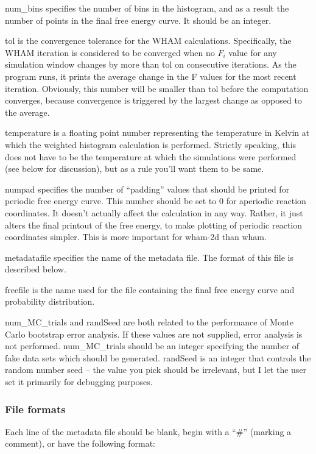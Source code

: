 \documentclass[12pt]{article}
\begin{document}
num\_bins specifies the number of bins in the histogram, and as a result the
number of points in the final free energy curve.  It should be an integer.

tol is the convergence tolerance for the WHAM calculations.  Specifically,
the WHAM iteration is considered to be converged when no $F_i$ value for any
simulation window changes by more than tol on consecutive iterations.  As
the program runs, it prints the average change in the F values for the most
recent iteration.  Obviously, this number will be smaller than tol
before the computation converges, because convergence is triggered by the
largest change as opposed to the average.

temperature is a floating point number representing the temperature in Kelvin at
which the weighted histogram calculation is performed.  Strictly speaking, this
does not have to be the temperature at which the simulations were performed (see
below for discussion), but as a rule you'll want them to be same.

numpad specifies the number of ``padding'' values that should be printed for
periodic free energy curve.  This number should be set to 0 for aperiodic
reaction coordinates.  It doesn't actually affect the calculation in any way.
Rather, it just alters the final printout of the free energy, to make plotting
of periodic reaction coordinates simpler.  This is more important for wham-2d
than wham.

metadatafile specifies the name of the metadata file.  The format of this
file is described below.

freefile is the name used for the file containing the final free energy curve
and probability distribution.

num\_MC\_trials and randSeed are both related to the performance of Monte
Carlo bootstrap error analysis.  If these values are not supplied, error
analysis is not performed.  num\_MC\_trials should be an integer specifying
the number of fake data sets which should be generated.  randSeed is an
integer that controls the random number seed -- the value you pick should
be irrelevant, but I let the user set it primarily for debugging purposes.

\subsubsection{File formats}
\label{ss:format}

Each line of the metadata file should be blank, begin with a ``\#'' (marking a
comment), or have the following format:
\end{document}
